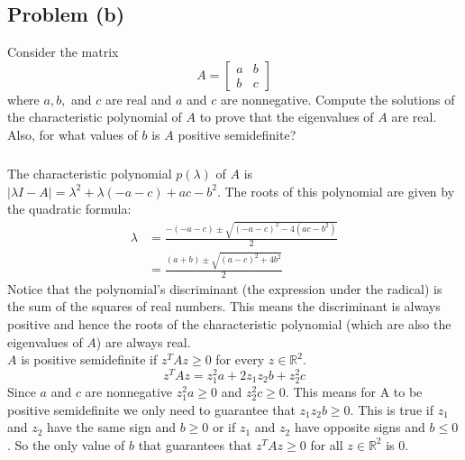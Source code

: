 \documentclass[11pt]{article}
\begin{document}
\subsection*{Problem (b)}
Consider the matrix
\begin{equation*}
	A=\begin{bmatrix} a & b \\ b & c \end{bmatrix}
\end{equation*}
where $a,b,$ and $c$ are real and $a$ and $c$ are nonnegative. Compute the solutions of the characteristic polynomial of $A$ to prove that the eigenvalues of $A$ are real. Also, for what values of $b$ is $A$ positive semidefinite?
\subparagraph*{}
The characteristic polynomial $p(\lambda)$ of $A$ is $|\lambda I - A| = \lambda^2 + \lambda(-a-c) + ac - b^2$. The roots of this polynomial are given by the quadratic formula:
\begin{align*}
	\lambda &= \frac{-(-a-c)\pm\sqrt{(-a-c)^2-4(ac-b^2)}}{2} \\
	&= \frac{(a+b)\pm\sqrt{(a-c)^2+4b^2}}{2}
\end{align*}
Notice that the polynomial's discriminant (the expression under the radical) is the sum of the squares of real numbers. This means the discriminant is always positive and hence the roots of the characteristic polynomial (which are also the eigenvalues of $A$) are always real.\\
$A$ is positive semidefinite if $z^TAz \geq 0$ for every $z \in \mathbb{R}^2$. 
\begin{equation*}
	z^TAz=z_1^2a + 2z_1z_2b + z_2^2c
\end{equation*}
Since $a$ and $c$ are nonnegative $z_1^2a \geq 0$ and $z_2^2c \geq 0$. This means for A to be positive semidefinite we only need to guarantee that $z_1z_2b \geq 0$. This is true if $z_1$ and $z_2$ have the same sign and $b \geq 0$ or if $z_1$ and $z_2$ have opposite signs and $b\leq0$. So the only value of $b$ that guarantees that $z^TAz\geq0$ for all $z\in\mathbb{R}^2$ is $0$.
\end{document}

